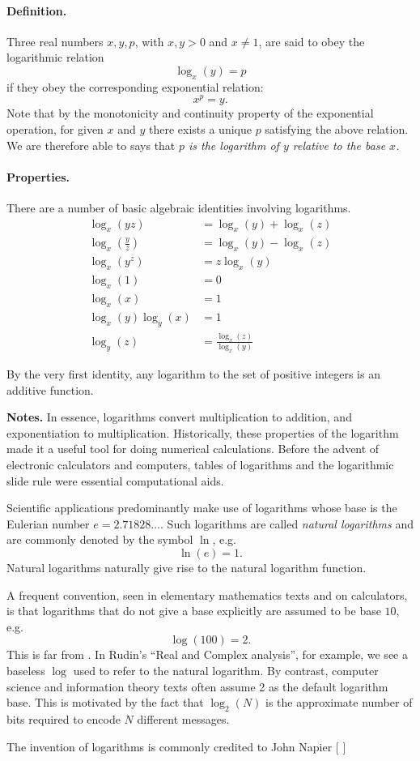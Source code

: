 \documentclass{article}
\begin{document}
\paragraph{Definition.}
Three real numbers $x, y, p$, with $x,y>0$ and $x \neq 1$, are said to obey the
logarithmic relation
$$\log_x(y)= p$$
if they obey the corresponding exponential relation:
$$x^p=y.$$
Note that by the monotonicity and continuity property of the
exponential operation, for given $x$ and $y$ there exists a unique $p$
satisfying the above relation.  We are therefore able to says that
{\em $p$ is the logarithm of $y$ relative to the base $x$.}

\paragraph{Properties.}
There are a number of basic algebraic identities involving logarithms.
\begin{align*}
\log_x(yz) &= \log_x(y) + \log_x(z)\\ 
\log_x \left( \frac{y}{z} \right) &= \log_x(y) - \log_x(z)\\
\log_x(y^z) &= z \log_x(y) \\
\log_x(1) &= 0 \\
\log_x(x) &= 1 \\
\log_x(y) \log_y(x) &= 1\\
\log_y(z) &= \frac{\log_x(z)}{\log_x(y)}
\end{align*}

By the very first identity, any logarithm  to the set of positive integers is an additive function.

{\bf Notes.} In essence, logarithms convert multiplication to
addition, and exponentiation to multiplication. Historically, these
properties of the logarithm made it a useful tool for doing numerical
calculations. Before the advent of electronic calculators and
computers, tables of logarithms and the logarithmic slide rule were
essential computational aids.

Scientific applications predominantly make use of
logarithms whose base is the Eulerian number $e = 2.71828\ldots$.
Such logarithms are called {\em natural logarithms} and are commonly
denoted by the symbol $\ln$, e.g.
$$\ln(e) = 1.$$
Natural logarithms naturally give rise to the natural logarithm function.

A frequent convention, seen in elementary mathematics texts and on
calculators, is that logarithms that do not give a base explicitly are
assumed to be base $10$, e.g.
$$\log(100) = 2.$$
This is far from .  In Rudin's ``Real and
Complex analysis'', for example, we see a baseless $\log$ used to
refer to the natural logarithm.  By contrast, computer science and
information theory texts often assume 2 as the default logarithm base.
This is motivated by the fact that $\log_2(N)$ is the approximate
number of bits required to encode $N$ different messages.


The invention of logarithms is commonly credited to John Napier [
]
\end{document}
